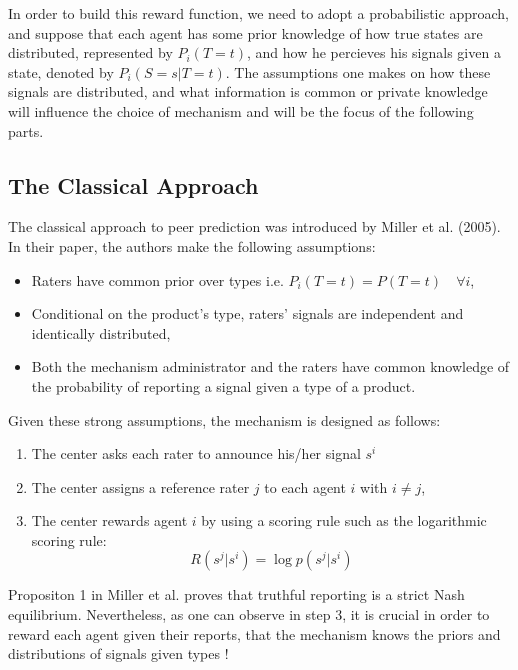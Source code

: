 \documentclass{scrartcl}
\begin{document}
In order to build this reward function, we need to adopt a probabilistic approach, and suppose that each agent has some prior knowledge of how true states are distributed, represented by $P_i(T=t)$, and how he percieves his signals given a state, denoted by $P_i(S = s | T = t)$. The assumptions one makes on how these signals are distributed, and what information is common or private knowledge will influence the choice of mechanism and will be the focus of the following parts.

\subsection{The Classical Approach}

The classical approach to peer prediction was introduced by Miller et al. (2005). In their paper, the authors make the following assumptions:

\begin{itemize}
\item Raters have common prior over types i.e. $P_i(T = t) = P(T = t) \quad\forall i$,
\item Conditional on the product’s type, raters’ signals are independent and identically distributed,
\item Both the mechanism administrator and the raters have common knowledge of the probability of reporting a signal given a type of a product.
\end{itemize}

Given these strong assumptions, the mechanism is designed as follows:
\begin{enumerate}
\item The center asks each rater to announce his/her signal $s^i$
\item The center assigns a reference rater $j$ to each agent $i$ with $i\neq j$,
\item The center rewards agent $i$ by using a scoring rule such as the logarithmic scoring rule:
$$R(s^j|s^i) = \log p(s^j|s^i)$$
\end{enumerate}

Propositon 1 in Miller et al. proves that truthful reporting is a strict Nash equilibrium. Nevertheless, as one can observe in step 3, it is crucial in order to reward each agent given their reports, that the mechanism knows the priors and distributions of signals given types ! 
\end{document}
